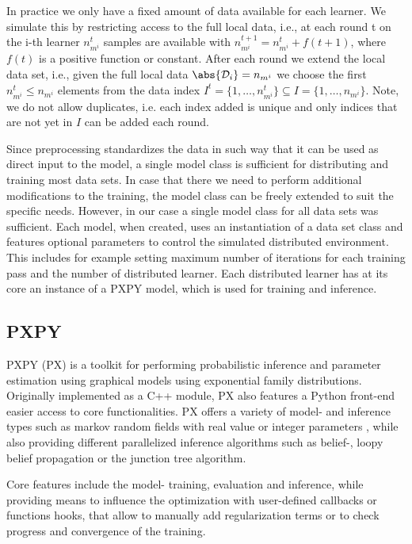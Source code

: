 In practice we  only have a fixed amount of data available for each learner.
We simulate this by restricting access to the full local data, i.e., at each round t on the i-th learner  $n^{t}_{m^i}$ samples are available with $n^{t+1}_{m^i} = n^{t}_{m^i} + f(t+1)$, where $f(t)$ is a positive function or constant.
After each round we extend the local data set, i.e., given the full local data $\abs{\mathcal{D}_i} = n_{m^i}$  we choose the first  $ n^{t}_{m^i} \leq n_{m^i}$ elements from the data index $I^t =\{1, \ldots, n^{t}_{m^i}\} \subseteq I = \{1, \ldots, n_{m^i}\}$. 
Note, we do not allow duplicates, i.e. each index added is unique and only indices that are not yet in $I$ can be added each round.



Since preprocessing standardizes the data in such way that it can be used as direct input to the model, a single model class is sufficient for distributing and training most data sets.
In case that there we need to perform additional modifications to the training, the model class can be freely extended to suit the specific needs.
However, in our case a single model class for all data sets was sufficient.
Each model, when created, uses an instantiation of a data set class and features optional parameters to control the simulated distributed environment. 
This includes for example setting maximum number of iterations for each training pass and the number of distributed learner.
Each distributed learner has at its core an instance of a PXPY model, which is used for training and inference.

\subsection{PXPY}
PXPY\cite{piatkowski2018exponential} (PX) is a toolkit for performing probabilistic inference and parameter estimation using graphical models using exponential family distributions.
Originally implemented as a C++ module, PX also features a Python front-end easier access to core functionalities.
PX offers a variety of  model- and inference types such as markov random fields with real value or integer parameters , while also providing different parallelized inference algorithms such as belief-, loopy belief propagation or the junction tree algorithm.

Core features include the model- training, evaluation and inference, while providing means to influence the optimization with user-defined callbacks or functions hooks, that allow to manually add regularization terms or to check progress and convergence of the training.

